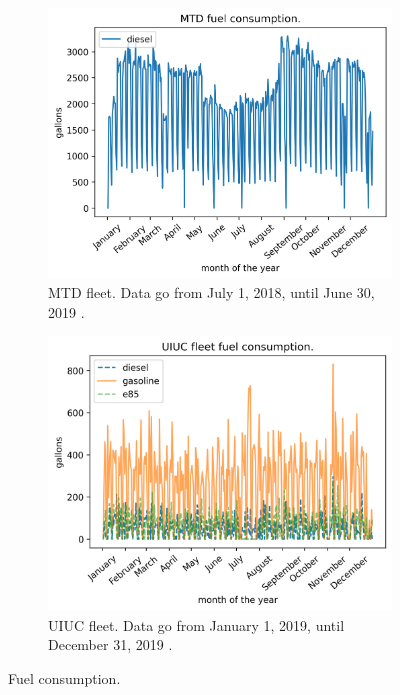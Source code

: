 \documentclass[11pt,letterpaper]{article}
\begin{document}
	\begin{figure}[htbp!]
		\centering
		\begin{subfigure}[t]{0.4\textwidth}
			\centering
			\includegraphics[width=\linewidth]{figures/mtd2}
			\caption{\gls{MTD} fleet. Data go from July 1, 2018, until June 30, 2019 \cite{mtd_irecords_2019}.}
		\end{subfigure}
		\begin{subfigure}[t]{0.4\textwidth}
			\centering
			\includegraphics[width=\linewidth]{figures/uiuc}
			\caption{\gls{UIUC} fleet. Data go from January 1, 2019, until December 31, 2019 \cite{uiuc_personnal_communication}.}
		\end{subfigure}
		\hfill
		\caption{Fuel consumption.}
		\label{fig:fuel}
	\end{figure}
\end{document}
